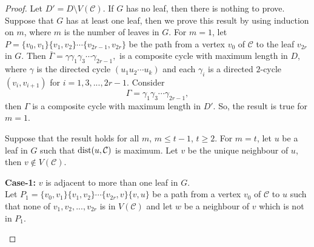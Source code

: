 \documentclass[a4paper, 10pt]{article}
\numberwithin{equation}{section}
\def\dist{{\rm dist}}
\begin{document}
\begin{proof} Let $D'=D\setminus V(\mathcal{C})$. If $G$ has no leaf, then there is nothing to prove. Suppose that $G$ has at least one leaf, then we prove this result by using induction on $m$, where $m$ is the number of leaves in $G$. For $m=1$, let $P=\{v_0,v_1\}\{v_1,v_2\}\cdots \{v_{2r-1},v_{2r}\}$ be the path from a vertex $v_0$ of $\mathcal{C}$ to the leaf $v_{2r}$ in $G$. Then $\bar{\Gamma}=\gamma\gamma_1\gamma_3\cdots\gamma_{2r-1},$ is a composite cycle with maximum length in $D$, 
	where $\gamma$ is the directed cycle $(u_1u_2\cdots u_k)$ and each $\gamma_i$ is a directed $2$-cycle $(v_i,v_{i+1})$ for $i=1,3,...,2r-1$. Consider
	$$\Gamma=\gamma_1\gamma_3\cdots\gamma_{2r-1},$$ 
	then $\Gamma$ is a composite cycle with maximum length in $D'$. So, the result is true for $m=1$.
	
	Suppose that the result holds
	for all $m$, $m \leq t-1$, $t \geq 2$.
	For $m = t$, let $u$ be a leaf in $G$ such that $\dist(u,\mathcal{C})$ is maximum. Let $v$ be the unique neighbour of $u$, then $v\notin V(\mathcal{C})$.
	
	\textbf{Case-1:} $v$ is adjacent to more than one leaf in $G$.\\
	Let $P_1=\{v_0,v_1\}\{v_1,v_2\}\cdots \{v_{2r},v\}\{v,u\}$ be a path from a vertex $v_0$ of $\mathcal{C}$ to $u$ such that none of $v_1,v_2,...,v_{2r}$ is in $V(\mathcal{C})$ and let $w$ be a neighbour of $v$ which is not in $P_1$. 
	\begin{figure}[H]
		\tikzset{node distance=1cm}
		\centering
\end{figure}
\end{proof}
\end{document}
